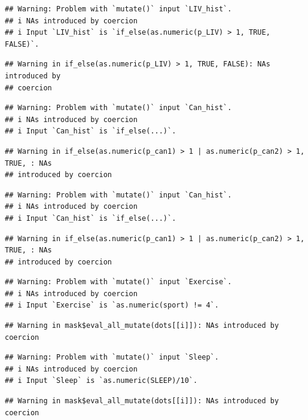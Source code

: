 \documentclass[
]{article}
\begin{document}
\begin{verbatim}
## Warning: Problem with `mutate()` input `LIV_hist`.
## i NAs introduced by coercion
## i Input `LIV_hist` is `if_else(as.numeric(p_LIV) > 1, TRUE, FALSE)`.
\end{verbatim}

\begin{verbatim}
## Warning in if_else(as.numeric(p_LIV) > 1, TRUE, FALSE): NAs introduced by
## coercion
\end{verbatim}

\begin{verbatim}
## Warning: Problem with `mutate()` input `Can_hist`.
## i NAs introduced by coercion
## i Input `Can_hist` is `if_else(...)`.
\end{verbatim}

\begin{verbatim}
## Warning in if_else(as.numeric(p_can1) > 1 | as.numeric(p_can2) > 1, TRUE, : NAs
## introduced by coercion
\end{verbatim}

\begin{verbatim}
## Warning: Problem with `mutate()` input `Can_hist`.
## i NAs introduced by coercion
## i Input `Can_hist` is `if_else(...)`.
\end{verbatim}

\begin{verbatim}
## Warning in if_else(as.numeric(p_can1) > 1 | as.numeric(p_can2) > 1, TRUE, : NAs
## introduced by coercion
\end{verbatim}

\begin{verbatim}
## Warning: Problem with `mutate()` input `Exercise`.
## i NAs introduced by coercion
## i Input `Exercise` is `as.numeric(sport) != 4`.
\end{verbatim}

\begin{verbatim}
## Warning in mask$eval_all_mutate(dots[[i]]): NAs introduced by coercion
\end{verbatim}

\begin{verbatim}
## Warning: Problem with `mutate()` input `Sleep`.
## i NAs introduced by coercion
## i Input `Sleep` is `as.numeric(SLEEP)/10`.
\end{verbatim}

\begin{verbatim}
## Warning in mask$eval_all_mutate(dots[[i]]): NAs introduced by coercion
\end{verbatim}
\end{document}
